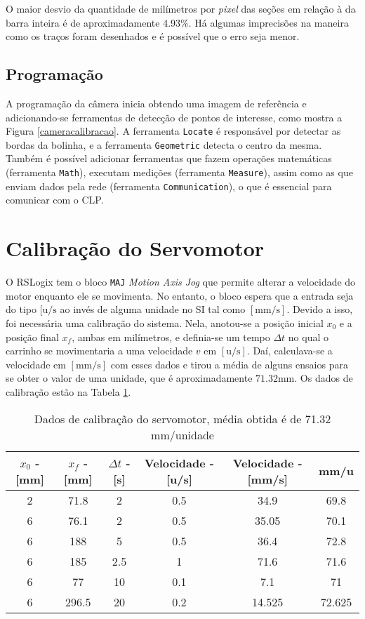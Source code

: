 O maior desvio da quantidade de milímetros por \textit{pixel} das seções em relação à da barra inteira é de aproximadamente 4.93\%. Há algumas imprecisões na maneira como os traços foram desenhados e é possível que o erro seja menor.

\subsection{Programação}
A programação da câmera inicia obtendo uma imagem de referência e adicionando-se ferramentas de detecção de pontos de interesse, como mostra a Figura \ref{cameracalibracao}. A ferramenta \texttt{Locate} é responsável por detectar as bordas da bolinha, e a ferramenta \texttt{Geometric} detecta o centro da mesma. Também é possível adicionar ferramentas que fazem operações matemáticas (ferramenta \texttt{Math}), executam medições (ferramenta \texttt{Measure}), assim como as que enviam dados pela rede (ferramenta \texttt{Communication}), o que é essencial para comunicar com o CLP.

\section{Calibração do Servomotor\label{calibracaoServomotorSecao}}

O RSLogix tem o bloco \texttt{MAJ} \textendash{} \textit{Motion Axis Jog} \textendash{} que permite alterar a velocidade do motor enquanto ele se movimenta. No entanto, o bloco espera que a entrada seja do tipo $[\mathrm{u}/\mathrm{s}$ ao invés de alguma unidade no SI tal como $[\mathrm{mm}/\mathrm{s}]$. Devido a isso, foi necessária uma calibração do sistema. Nela, anotou-se a posição inicial $x_0$ e a posição final $x_f$, ambas em milímetros, e definia-se um tempo $\Delta t$ no qual o carrinho se movimentaria a uma velocidade $v$ em $[\mathrm{u}/\mathrm{s}]$. Daí, calculava-se a velocidade em $[\mathrm{mm}/\mathrm{s}]$ com esses dados e tirou a média de alguns ensaios para se obter o valor de uma unidade, que é aproximadamente $71.32\mathrm{mm}$. Os dados de calibração estão na Tabela \ref{calibracaoServomotor}.

\begin{table}[!ht]
\centering
\caption{Dados de calibração do servomotor, média obtida é de 71.32 mm/unidade\label{calibracaoServomotor}}
\begin{tabular}{|c|c|c|c|c|c|}
\hline
	$x_0$ - [mm] & $x_f$ - [mm] & $\Delta t$ - [s] & Velocidade - [u/s] & Velocidade - [mm/s] & mm/u\\ \hline
2 &	71.8  &	2   &	0.5 &	34.9   & 	69.8\\ \hline
6 & 76.1  &	2   &	0.5 &	35.05  &	70.1\\ \hline
6 &	188	  &  5   &	0.5	&   36.4   &	72.8\\ \hline
6 &	185   &	2.5 &	1	& 	71.6   &	71.6\\ \hline
6 &	77    &	10  &	0.1	&   7.1    &	71\\ \hline
6 &	296.5 &	20	&   0.2 & 	14.525 &	72.625\\ \hline\end{tabular}
\end{table}

